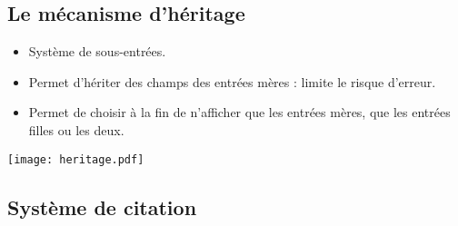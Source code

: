 \subsection{Le mécanisme d'héritage}

\begin{slide}
  \begin{itemize}
    \item Système de sous-entrées.
    \item Permet d'hériter des champs des entrées mères : limite le risque d'erreur.
    \item Permet de choisir à la fin de n'afficher que les entrées mères, que les entrées filles ou les deux.
\end{itemize}
\end{slide}

\begin{slide}
 \centering
 \texttt{[image: heritage.pdf]}

 \cite{Maraval1998}
\end{slide}

\subsection{Système de citation}

\begin{slide}
  \begin{columns}

    \begin{column}
	\cite{BHG226}
	
	\cite[(3)630]{Pleiade_Barnabe}

	\cite[(1)629]{Pleiade_Barnabe}

	\cite{BHG226}

    \end{column}
  \end{columns}
\end{slide}
